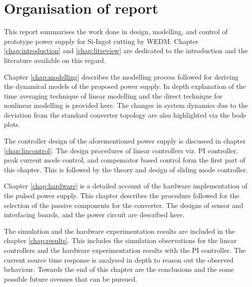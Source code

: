 \section{Organisation of report}
	This report summarises the work done in design, modelling, and control of prototype power supply for Si-Ingot cutting by WEDM. Chapter \ref{chap:introduction} and \ref{chap:litreview} are dedicated to the introduction and the literature available on this regard.
	
	Chapter \ref{chap:modelling} describes the modelling process followed for deriving the dynamical models of the proposed power supply. In depth explanation of the time averaging technique of linear modelling and the direct technique for nonlinear modelling is provided here. The changes in system dynamics due to the deviation from the standard converter topology are also highlighted via the bode plots.

	The controller design of the aforementioned power supply is discussed in chapter \ref{chap:lincontrol}. The design procedures of linear controllers viz. PI controller, peak current mode control, and compensator based control form the first part of this chapter. This is followed by the theory and design of sliding mode controller.
	
	Chapter \ref{chap:hardware} is a detailed account of the hardware implementation of the pulsed power supply. This chapter describes the procedure followed for the selection of the passive components for the converter. The designs of sensor and interfacing boards, and the power circuit are described here.
	
	The simulation and the hardware experimentation results are included in the chapter \ref{chap:results}. This includes the simulation observations for the linear controllers and the hardware experimentation results with the PI controller. The current source time response is analysed in depth to reason out the observed behaviour. Towards the end of this chapter are the conclusions and the some possible future avenues that can be pursued.
	
	
